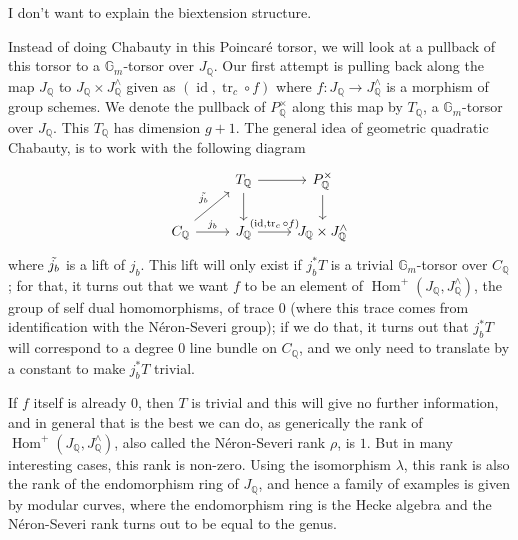 \documentclass[12pt]{article}
\renewcommand{\G}{\mathbb{G}}
\newcommand{\Q}{\mathbb{Q}}
\DeclareMathOperator{\Hom}{Hom}
\DeclareMathOperator{\id}{id}
\DeclareMathOperator{\tr}{tr}
\theoremstyle{plain}
\theoremstyle{definition}
\theoremstyle{remark}
\begin{document}
I don't want to explain the biextension structure. 

Instead of doing Chabauty in this Poincar\'e torsor, we will look at a pullback of this torsor to a $\G_m$-torsor over $J_\Q$. Our first attempt is pulling back along the map $J_\Q$ to $J_\Q \times J^\wedge_\Q$ given as $(\id,\tr_c \circ f)$ where $f: J_\Q \to J^\wedge_\Q$ is a morphism of group schemes. We denote the pullback of $P^\times_\Q$ along this map by $T_\Q$, a $\G_m$-torsor over $J_\Q$. This $T_\Q$ has dimension $g+1$. The general idea of geometric quadratic Chabauty, is to work with the following diagram
\[\begin{tikzcd} %
                                                & T_\Q \arrow[d] \arrow[r]                   & P_\Q^\times \arrow[d]      \\
C_\Q \arrow[ru, "\Tilde{j_b}"] \arrow[r, "j_b"] & J_\Q \arrow[r, "{(\id,\tr_c \circ f)}"] & J_\Q \times J^\wedge_\Q
\end{tikzcd}\]
where $\Tilde{j_b}$ is a lift of $j_b$. This lift will only exist if $j_b^* T$ is a trivial $\G_m$-torsor over $C_\Q$; for that, it turns out that we want $f$ to be an element of $\Hom^+(J_\Q,J^\wedge_\Q)$, the group of self dual homomorphisms, of trace $0$ (where this trace comes from identification with the N\'eron-Severi group); if we do that, it turns out that $j_b^* T$ will correspond to a degree $0$ line bundle on $C_\Q$, and we only need to translate by a constant to make $j_b^* T$ trivial.

If $f$ itself is already $0$, then $T$ is trivial and this will give no further information, and in general that is the best we can do, as generically the rank of $\Hom^+(J_\Q,J^\wedge_\Q)$, also called the N\'eron-Severi rank $\rho$, is $1$. But in many interesting cases, this rank is non-zero. Using the isomorphism $\lambda$, this rank is also the rank of the endomorphism ring of $J_\Q$, and hence a family of examples is given by modular curves, where the endomorphism ring is the Hecke algebra and the N\'eron-Severi rank turns out to be equal to the genus.
\end{document}
